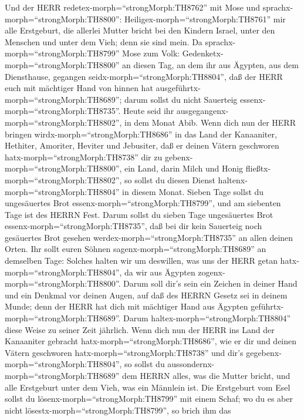  Und der HERR redetex-morph=``strongMorph:TH8762'' mit Mose
und sprachx-morph=``strongMorph:TH8800'': 
Heiligex-morph=``strongMorph:TH8761'' mir alle Erstgeburt, die allerlei
Mutter bricht bei den Kindern Israel, unter den Menschen und unter dem
Vieh; denn sie sind mein.  Da
sprachx-morph=``strongMorph:TH8799'' Mose zum Volk:
Gedenketx-morph=``strongMorph:TH8800'' an diesen Tag, an dem ihr aus
Ägypten, aus dem Diensthause, gegangen
seidx-morph=``strongMorph:TH8804'', daß der HERR euch mit mächtiger Hand
von hinnen hat ausgeführtx-morph=``strongMorph:TH8689''; darum sollst du
nicht Sauerteig essenx-morph=``strongMorph:TH8735''.  Heute
seid ihr ausgegangenx-morph=``strongMorph:TH8802'', in dem Monat Abib.
 Wenn dich nun der HERR bringen
wirdx-morph=``strongMorph:TH8686'' in das Land der Kanaaniter, Hethiter,
Amoriter, Heviter und Jebusiter, daß er deinen Vätern geschworen
hatx-morph=``strongMorph:TH8738'' dir zu
gebenx-morph=``strongMorph:TH8800'', ein Land, darin Milch und Honig
fließtx-morph=``strongMorph:TH8802'', so sollst du diesen Dienst
haltenx-morph=``strongMorph:TH8804'' in diesem Monat. 
Sieben Tage sollst du ungesäuertes Brot
essenx-morph=``strongMorph:TH8799'', und am siebenten Tage ist des HERRN
Fest.  Darum sollst du sieben Tage ungesäuertes Brot
essenx-morph=``strongMorph:TH8735'', daß bei dir kein Sauerteig noch
gesäuertes Brot gesehen werdex-morph=``strongMorph:TH8735'' an allen
deinen Orten.  Ihr sollt euren Söhnen
sagenx-morph=``strongMorph:TH8689'' an demselben Tage: Solches halten
wir um deswillen, was uns der HERR getan
hatx-morph=``strongMorph:TH8804'', da wir aus Ägypten
zogenx-morph=``strongMorph:TH8800''.  Darum soll dir's sein
ein Zeichen in deiner Hand und ein Denkmal vor deinen Augen, auf daß des
HERRN Gesetz sei in deinem Munde; denn der HERR hat dich mit mächtiger
Hand aus Ägypten geführtx-morph=``strongMorph:TH8689''. 
Darum haltex-morph=``strongMorph:TH8804'' diese Weise zu seiner Zeit
jährlich.  Wenn dich nun der HERR ins Land der Kanaaniter
gebracht hatx-morph=``strongMorph:TH8686'', wie er dir und deinen Vätern
geschworen hatx-morph=``strongMorph:TH8738'' und dir's
gegebenx-morph=``strongMorph:TH8804'',  so sollst du
aussondernx-morph=``strongMorph:TH8689'' dem HERRN alles, was die Mutter
bricht, und alle Erstgeburt unter dem Vieh, was ein Männlein ist.
 Die Erstgeburt vom Esel sollst du
lösenx-morph=``strongMorph:TH8799'' mit einem Schaf; wo du es aber nicht
lösestx-morph=``strongMorph:TH8799'', so brich ihm das
